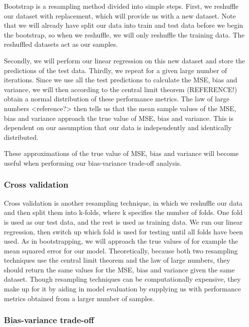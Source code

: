 \documentclass[twocolumn,10pt,cleanfoot]{asme2ej}
\begin{document}
Bootstrap is a resampling method divided into simple steps. First, we reshuffle our dataset with replacement, which will provide us with a new dataset. Note that we will already have split our data into train and test data before we begin the bootstrap, so when we reshuffle, we will only reshuffle the training data. The reshuffled datasets act as our samples.

Secondly, we will perform our linear regression on this new dataset and store the predictions of the test data. Thirdly, we repeat for a given large number of iterations. Since we use all the test predictions to calculate the MSE, bias and variance, we will then according to the central limit theorem (REFERENCE!) obtain a normal distribution of these performance metrics. The law of large numbers <reference?> then tells us that the mean sample values of the MSE, bias and variance approach the true value of MSE, bias and variance. This is dependent on our assumption that our data is independently and identically distributed.

These approximations of the true value of MSE, bias and variance will become useful when performing our bias-variance trade-off analysis.


\subsubsection{Cross validation}

Cross validation is another resampling technique, in which we reshuffle our data and then split them into k-folds, where k specifies the number of folds. One fold is used as our test data, and the rest is used as training data. We run our linear regression, then switch up which fold is used for testing until all folds have been used. As in bootstrapping, we will approach the true values of for example the mean squared error for our model. 
Theoretically, because both two resampling techniques use the central limit theorem and the law of large numbers, they should return the same values for the MSE, bias and variance given the same dataset. Though resampling techniques can be computationally expensive, they make up for it by aiding in model evaluation by supplying us with performance metrics obtained from a larger number of samples. 

\subsubsection{Bias-variance trade-off}
\end{document}
